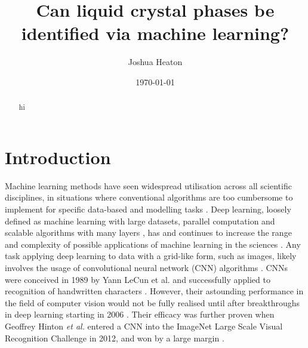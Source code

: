 \documentclass[12pt]{article}
\begin{document}
\title{Can liquid crystal phases be identified via machine learning?}
\author{Joshua Heaton}
\date{\today}

\maketitle

\begin{abstract}
hi
\end{abstract}

\newpage
{}

\section{Introduction}
Machine learning methods have seen widespread utilisation across all scientific disciplines, in situations where conventional algorithms are too cumbersome to implement for specific data-based and modelling tasks \cite{Carleo19}. Deep learning, loosely defined as machine learning with large datasets, parallel computation and scalable algorithms with many layers \cite{Goodfellow16}, has and continues to increase the range and complexity of possible applications of machine learning in the sciences \cite{Carleo19}. Any task applying deep learning to data with a grid-like form, such as images, likely involves the usage of convolutional neural network (CNN) algorithms \cite{Goodfellow16}. CNNs were conceived in 1989 by Yann LeCun et al. and successfully applied to recognition of handwritten characters \cite{LeCun89}. However, their astounding performance in the field of computer vision would not be fully realised until after breakthroughs in deep learning starting in 2006 \cite{Goodfellow16}. Their efficacy was further proven when Geoffrey Hinton \textit{et al.} entered a CNN into the ImageNet Large Scale Visual Recognition Challenge in 2012, and won by a large margin \cite{ILSVRC15}.
\end{document}
